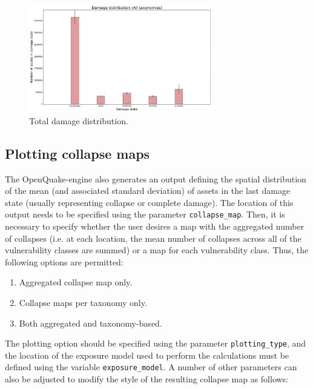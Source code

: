 \begin{figure}[htb]
  \centering
      \includegraphics[width=8cm]{figures/total_damage_dist.png}
  \caption{Total damage distribution.}
  \label{fig:total_dmg}
\end{figure}

\subsection{Plotting collapse maps}
\label{subsec:plot-collapse_maps}

The OpenQuake-engine also generates an output defining the spatial distribution of the mean (and associated standard deviation) of assets in the last damage state (usually representing collapse or complete damage). The location of this output needs to be specified using the parameter \verb=collapse_map=. Then, it is necessary to specify whether the user desires a map with the aggregated number of collapses (i.e. at each location, the mean number of collapses across all of the vulnerability classes are summed) or a map for each vulnerability class. Thus, the following options are permitted:\\

\begin{enumerate}
\item Aggregated collapse map only.
\item Collapse maps per taxonomy only.
\item Both aggregated and taxonomy-based.\\
\end{enumerate}

The plotting option should be specified using the parameter \verb=plotting_type=, and the location of the exposure model used to perform the calculations must be defined using the variable \verb=exposure_model=. A number of other parameters can also be adjusted to modify the style of the resulting collapse map as follows:\\

